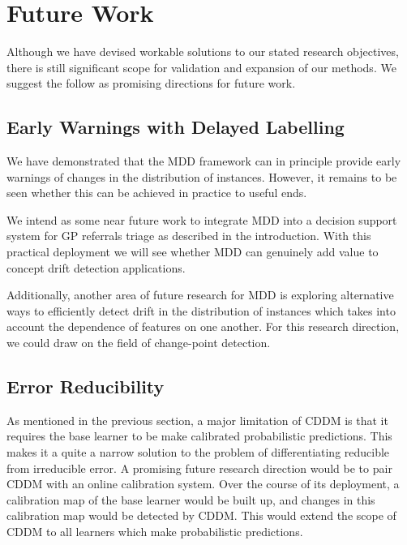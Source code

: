 
\section{Future Work} \label{conclusions:future_word}

Although we have devised workable solutions to our stated research objectives, there is still significant scope for validation and expansion of our methods. We suggest the follow as promising directions for future work.

\subsection{Early Warnings with Delayed Labelling}

We have demonstrated that the MDD framework can in principle provide early warnings of changes in the distribution of instances. However, it remains to be seen whether this can be achieved in practice to useful ends.

We intend as some near future work to integrate MDD into a decision support system for GP referrals triage as described in the introduction. With this practical deployment we will see whether MDD can genuinely add value to concept drift detection applications.

Additionally, another area of future research for MDD is exploring alternative ways to efficiently detect drift in the distribution of instances which takes into account the dependence of features on one another. For this research direction, we could draw on the field of change-point detection.

\subsection{Error Reducibility}

As mentioned in the previous section, a major limitation of CDDM is that it requires the base learner to be make calibrated probabilistic predictions. This makes it a quite a narrow solution to the problem of differentiating reducible from irreducible error. A promising future research direction would be to pair CDDM with an online calibration system. Over the course of its deployment, a calibration map of the base learner would be built up, and changes in this calibration map would be detected by CDDM. This would extend the scope of CDDM to all learners which make probabilistic predictions.

